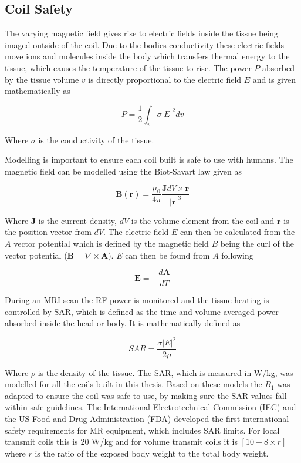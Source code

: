 \subsection{Coil Safety}

The varying magnetic field gives rise to electric fields inside the tissue being imaged outside of the coil. Due to the bodies conductivity these electric fields move ions and molecules inside the body which transfers thermal energy to the tissue, which causes the temperature of the tissue to rise. The power $P$ absorbed by the tissue volume $v$ is directly proportional to the electric field $E$ and is given mathematically as 

\begin{equation}
    P = \frac{1}{2}\int_v \sigma|E|^2dv
\end{equation}

Where $\sigma$ is the conductivity of the tissue. 

Modelling is important to ensure each coil built is safe to use with humans. The magnetic field can be modelled using the Biot-Savart law given as 

\begin{equation}
    \mathbf{B(r)} = \frac{\mu_0}{4\pi}\frac{\mathbf{J}dV \times \mathbf{r}}{|\mathbf{r}|^3}
\end{equation}

Where $\mathbf{J}$ is the current density, $dV$ is the volume element from the coil and $\mathbf{r}$ is the position vector from $dV$. The electric field $E$ can then be calculated from the $A$ vector potential which is defined by the magnetic field $B$ being the curl of the vector potential ($\mathbf{B} = \nabla \times \mathbf{A}$). $E$ can then be found from $A$ following

\begin{equation}
    \mathbf{E} = -\frac{d\mathbf{A}}{dT}
\end{equation}

During an \ac{MRI} scan the \ac{RF} power is monitored and the tissue heating is controlled by \ac{SAR}, which is defined as the time and volume averaged power absorbed inside the head or body. It is mathematically defined as 

\begin{equation}
    SAR = \frac{\sigma|E|^2}{2\rho}
\end{equation}

Where $\rho$ is the density of the tissue. The \ac{SAR}, which is measured in W/kg, was modelled for all the coils built in this thesis. Based on these models the $B_1$ was adapted to ensure the coil was safe to use, by making sure the \ac{SAR} values fall within safe guidelines. The International Electrotechnical Commission (IEC) and the US Food and Drug Administration (FDA) developed the first international safety requirements for MR equipment, which includes \ac{SAR} limits. For local transmit coils this is 20 W/kg and for volume transmit coils it is $[10 - 8\times r]$ where $r$ is the ratio of the exposed body weight to the total body weight.

